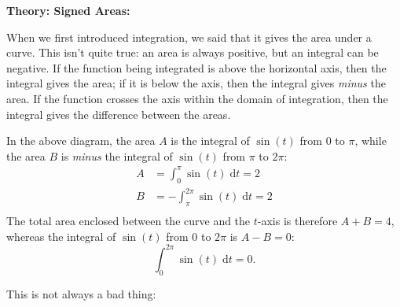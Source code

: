 \documentclass{article}
\newcommand{\diff}{\;\mathrm{d}}
\begin{document}
\clearpage


\textbf{Theory: Signed Areas:}

\bigskip


When we first introduced integration, we said that it gives the area under a curve. This isn't quite true: an area is always positive, but an integral can be negative. If the function being integrated is above the horizontal axis, then the integral gives the area; if it is below the axis, then the integral gives \textit{minus} the area. If the function crosses the axis within the domain of integration, then the integral gives the difference between the areas.\medskip

\begin{center}
\end{center}

In the above diagram, the area $A$ is the integral of $\sin(t)$ from $0$ to $\pi$, while the area $B$ is \textit{minus} the integral of $\sin(t)$ from $\pi$ to $2\pi$:
\begin{align*}
	A&=\int_0^\pi \sin(t)\diff t = 2\\
	B&=-\int_\pi^{2\pi}\sin(t)\diff t = 2\\
\end{align*}
The total area enclosed between the curve and the $t$-axis is therefore $A+B=4$, whereas the integral of $\sin(t)$ from $0$ to $2\pi$ is $A-B=0$:
\[\int_0^{2\pi}\sin(t)\diff t=0.\]

This is not always a bad thing:\medskip
\end{document}
